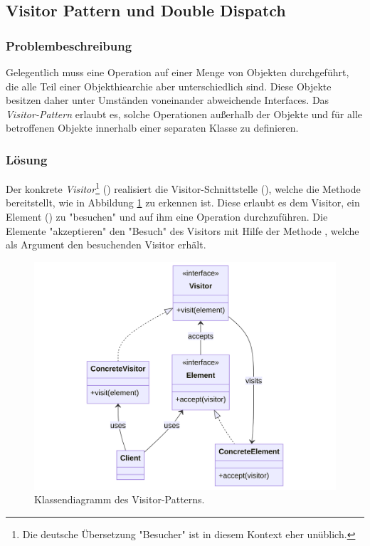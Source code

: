 \subsection{Visitor Pattern und Double Dispatch}


\subsubsection*{Problembeschreibung}

Gelegentlich muss eine Operation auf einer Menge von Objekten durchgeführt, die alle Teil einer Objekthiearchie aber unterschiedlich sind. Diese Objekte besitzen daher unter Umständen voneinander abweichende Interfaces. Das \emph{Visitor-Pattern} erlaubt es, solche Operationen außerhalb der Objekte und für alle betroffenen Objekte innerhalb einer separaten Klasse zu definieren. \cite{gamma_design_1995}

\subsubsection*{Lösung}

Der konkrete \emph{Visitor}\footnote{Die deutsche Übersetzung "Besucher" ist in diesem Kontext eher unüblich.} () realisiert die Visitor-Schnittstelle (), welche die Methode  bereitstellt, wie in Abbildung \ref{fig:visitor-class} zu erkennen ist. Diese erlaubt es dem Visitor, ein Element () zu "besuchen" und auf ihm eine Operation durchzuführen. Die Elemente "akzeptieren" den "Besuch" des Visitors mit Hilfe der Methode , welche als Argument den besuchenden Visitor erhält.

\begin{figure}[htbp]
	\centering
	\includegraphics[width=0.75\linewidth]{images/patterns/visitor-class.png}
	\caption{Klassendiagramm des Visitor-Patterns. \cite{skobeleva_visitor_2023}}
	\label{fig:visitor-class}
\end{figure}

